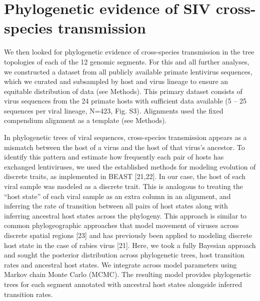 \section{Phylogenetic evidence of SIV cross-species transmission}
We then looked for phylogenetic evidence of cross-species transmission in the tree topologies of each of the 12 genomic segments.
For this and all further analyses, we constructed a dataset from all publicly available primate lentivirus sequences, which we curated and subsampled by host and virus lineage to ensure an equitable distribution of data (see Methods).
This primary dataset consists of virus sequences from the 24 primate hosts with sufficient data available (5 – 25 sequences per viral lineage, N=423, Fig. S3).
Alignments used the fixed compendium alignment as a template (see Methods).

In phylogenetic trees of viral sequences, cross-species transmission appears as a mismatch between the host of a virus and the host of that virus’s ancestor.
To identify this pattern and estimate how frequently each pair of hosts has exchanged lentiviruses, we used the established methods for modeling evolution of discrete traits, as implemented in BEAST [21,22].
In our case, the host of each viral sample was modeled as a discrete trait.
This is analogous to treating the “host state” of each viral sample as an extra column in an alignment, and inferring the rate of transition between all pairs of host states along with inferring ancestral host states across the phylogeny.
This approach is similar to common phylogeographic approaches that model movement of viruses across discrete spatial regions [23] and has previously been applied to modeling discrete host state in the case of rabies virus [21].
Here, we took a fully Bayesian approach and sought the posterior distribution across phylogenetic trees, host transition rates and ancestral host states.
We integrate across model parameters using Markov chain Monte Carlo (MCMC).
The resulting model provides phylogenetic trees for each segment annotated with ancestral host states alongside inferred transition rates.

